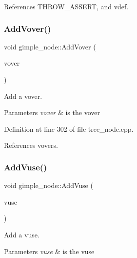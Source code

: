 References T\+H\+R\+O\+W\+\_\+\+A\+S\+S\+E\+RT, and vdef.

\mbox{\label{structgimple__node_af12362bd30c5aecd4901183e99e745b5}} 
\subsubsection{\texorpdfstring{Add\+Vover()}{AddVover()}}
{\footnotesize\ttfamily void gimple\+\_\+node\+::\+Add\+Vover (\begin{DoxyParamCaption}\item[{const \hyperlink{tree__node_8hpp_a6ee377554d1c4871ad66a337eaa67fd5}{tree\+\_\+node\+Ref} \&}]{vover }\end{DoxyParamCaption})}



Add a vover. 


\begin{DoxyParams}{Parameters}
{\em vover} & is the vover \\
\hline
\end{DoxyParams}


Definition at line 302 of file tree\+\_\+node.\+cpp.



References vovers.

\mbox{\label{structgimple__node_a6f29a0d5137eb6deca64f1f8bcf938e9}} 
\subsubsection{\texorpdfstring{Add\+Vuse()}{AddVuse()}}
{\footnotesize\ttfamily void gimple\+\_\+node\+::\+Add\+Vuse (\begin{DoxyParamCaption}\item[{const \hyperlink{tree__node_8hpp_a6ee377554d1c4871ad66a337eaa67fd5}{tree\+\_\+node\+Ref} \&}]{vuse }\end{DoxyParamCaption})}



Add a vuse. 


\begin{DoxyParams}{Parameters}
{\em vuse} & is the vuse \\
\hline
\end{DoxyParams}


